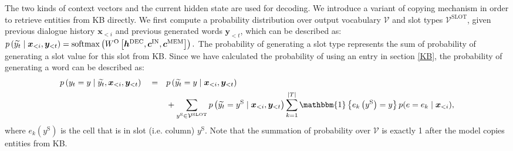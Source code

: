 \documentclass[11pt]{article}
\begin{document}
The two kinds of context vectors and the current hidden state are used for decoding. 
We introduce a variant of copying mechanism \cite{gu:2016:ACL} in order to retrieve entities from KB directly. We first compute a probability distribution over output vocabulary $\mathcal{V}$ and slot types $\mathcal{V}^{\text{SLOT}}$, given previous dialogue history $\boldsymbol x_{<i}$ and previous generated words $\boldsymbol y_{<t}$, which can be described as:
$p\left(\widetilde{y_t}\mid \boldsymbol x_{<i}, \boldsymbol y_{<t}\right)
= \mathrm{softmax}\left(W^{\text O}\left[\boldsymbol h^{\text{DEC}}, \boldsymbol c^{\text{IN}}, \boldsymbol c^{\text{MEM}}\right]\right).$
The probability of generating a slot type represents the sum of probability of generating a slot value for this slot from KB. Since we have calculated the probability of using an entry in section \ref{KB}, the probability of generating a word can be described as:
\begin{align*}
p\left(y_t = y\mid\widetilde{y_t}, \boldsymbol x_{<i}, \boldsymbol y_{<t}\right) \quad=\quad &p\left(\widetilde{y_t} = y\mid \boldsymbol x_{<i}, \boldsymbol y_{<t}\right) \\&+ \sum_{y^{\text{S}} \in \mathcal V^{\text{SLOT}}} p\left(\widetilde{y_t} = y^{\text S}\mid \boldsymbol x_{<i}, \boldsymbol y_{<t}\right) \sum_{k = 1}^{|T|}\mathbbm{1}\left\{e_k\left(y^{\text S}\right) = y\right\}p(e = e_k\mid \boldsymbol x_{<i}),
\end{align*}
where $e_k\left(y^\text{S}\right)$ is the cell that is in slot (i.e. column) $y^\text{S}$.
Note that the summation of probability over $\mathcal{V}$ is exactly 1 after the model copies entities from KB.
\end{document}

